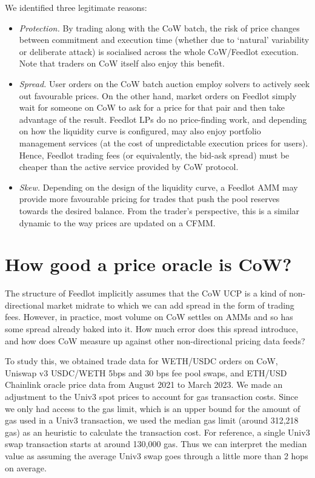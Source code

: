 \documentclass[a4paper,10pt]{article}
\theoremstyle{remark}
\begin{document}
We identified three legitimate reasons:
\begin{itemize}
  \item 
    \emph{Protection.} By trading along with the CoW batch, the risk of price changes between commitment and execution time (whether due to `natural' variability or deliberate attack) is socialised across the whole CoW/Feedlot execution.
    Note that traders on CoW itself also enjoy this benefit.
    
  \item
    \emph{Spread.} User orders on the CoW batch auction employ solvers to actively seek out favourable prices. On the other hand, market orders on Feedlot simply wait for someone on CoW to ask for a price for that pair and then take advantage of the result.
    Feedlot LPs do no price-finding work, and depending on how the liquidity curve is configured, may also enjoy portfolio management services (at the cost of unpredictable execution prices for users).
    Hence, Feedlot trading fees (or equivalently, the bid-ask spread) must be cheaper than the active service provided by CoW protocol.
    
  \item
    \emph{Skew.} Depending on the design of the liquidity curve, a Feedlot AMM may provide more favourable pricing for trades that push the pool reserves towards the desired balance.
    From the trader's perspective, this is a similar dynamic to the way prices are updated on a CFMM.

\end{itemize}

\section{How good a price oracle is CoW?}
\label{price-analysis}

The structure of Feedlot implicitly assumes that the CoW UCP is a kind of non-directional market midrate to which we can add spread in the form of trading fees.
%
However, in practice, most volume on CoW settles on AMMs and so has some spread already baked into it.
%
How much error does this spread introduce, and how does CoW measure up against other non-directional pricing data feeds?

To study this, we obtained trade data for WETH/USDC orders on CoW, Uniswap v3 USDC/WETH 5bps and 30 bps fee pool swaps, and ETH/USD Chainlink oracle price data from August 2021 to March 2023. 
%
We made an adjustment to the Univ3 spot prices to account for gas transaction costs. 
%
Since we only had access to the gas limit, which is an upper bound for the amount of gas used in a Univ3 transaction, we used the median gas limit (around 312,218 gas) as an heuristic to calculate the transaction cost. 
%
For reference, a single Univ3 swap transaction starts at around 130,000 gas. 
%
Thus we can interpret the median value as assuming the average Univ3 swap goes through a little more than 2 hops on average.
\end{document}
